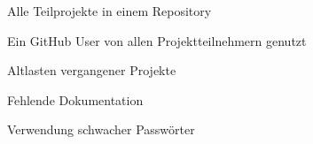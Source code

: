\begin{frame}
\begin{block}{}
	Alle Teilprojekte in einem Repository
\end{block}
\begin{block}{}
	Ein GitHub User von allen Projektteilnehmern genutzt
\end{block}
\begin{block}{}
	Altlasten vergangener Projekte
\end{block}
\begin{block}{}
	Fehlende Dokumentation
\end{block}
\begin{block}{}
	Verwendung schwacher Passwörter
\end{block}
\end{frame}